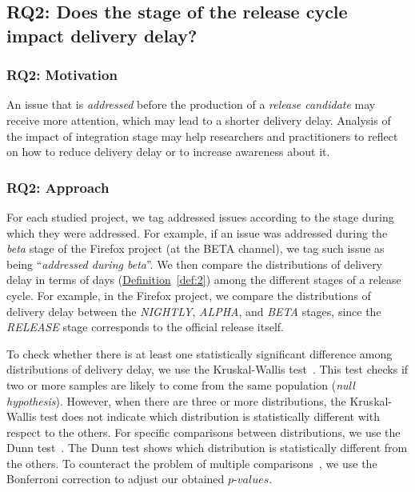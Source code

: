 \subsection{RQ2: Does the stage of the release cycle impact
delivery delay?}\label{ch4:rq2}

\subsubsection*{RQ2: Motivation}

An issue that is {\em addressed} before the production of a {\em release candidate}
may receive more attention, which may lead to a shorter delivery delay.
Analysis of the impact of integration stage may help researchers and
practitioners to reflect on how to reduce delivery delay or to increase
awareness about it.

\subsubsection*{RQ2: Approach} 

For each studied project, we tag addressed issues according to the stage during
which they were addressed. For example, if an issue was addressed during the {\em beta}
stage of the Firefox project (\ie at the BETA channel), we tag such issue as
being ``{\em addressed during beta}''. We then compare the distributions of
delivery delay in terms of days (\hyperref[def:2]{Definition}~\ref{def:2})
among the different stages of a release cycle. For example, in the Firefox
project, we compare the distributions of delivery delay between the {\em
NIGHTLY}, {\em ALPHA}, and {\em BETA} stages, since the {\em RELEASE} stage
corresponds to the official release itself.

To check whether there is at least one statistically significant difference
among distributions of delivery delay, we use the Kruskal-Wallis
test~\cite{kruskal1952use}. This test checks if two or more samples are likely
to come from the same population ({\em null hypothesis}). However, when there are three or
more distributions, the Kruskal-Wallis test does not indicate which distribution
is statistically different with respect to the others. For specific comparisons
between distributions, we use the Dunn test~\cite{dunn1964multiple}. The Dunn
test shows which distribution is statistically different from the others. To
counteract the problem of multiple comparisons~\cite{dunn1961multiple}, we use
the Bonferroni correction to adjust our obtained $p$-$values$.

